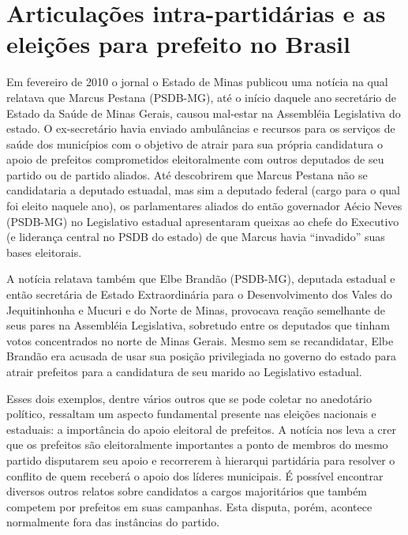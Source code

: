 \chapter{Articulações intra-partidárias e as eleições para prefeito no Brasil}
\label{cap:eleicoes}

Em fevereiro de 2010 o jornal o Estado de Minas publicou uma notícia na qual relatava que Marcus Pestana (PSDB-MG), até o início daquele ano secretário de Estado da Saúde de Minas Gerais, causou mal-estar na Assembléia Legislativa do estado. O ex-secretário havia enviado ambulâncias e recursos para os serviços de saúde dos municípios com o objetivo de atrair para sua própria candidatura o apoio de prefeitos comprometidos eleitoralmente com outros deputados de seu partido ou de partido aliados. Até descobrirem que Marcus Pestana não se candidataria a deputado estuadal, mas sim a deputado federal (cargo para o qual foi eleito naquele ano), os parlamentares aliados do então governador Aécio Neves (PSDB-MG) no Legislativo estadual apresentaram queixas ao chefe do Executivo (e liderança central no PSDB do estado) de que Marcus havia ``invadido'' suas bases eleitorais. 

A notícia relatava também que Elbe Brandão (PSDB-MG), deputada estadual e então secretária de Estado Extraordinária para o Desenvolvimento dos Vales do Jequitinhonha e Mucuri e do Norte de Minas, provocava reação semelhante de seus pares na Assembléia Legislativa, sobretudo entre os deputados que tinham votos concentrados no norte de Minas Gerais. Mesmo sem se recandidatar, Elbe Brandão era acusada de usar sua posição privilegiada no governo do estado para atrair prefeitos para a candidatura de seu marido ao Legislativo estadual.

Esses dois exemplos, dentre vários outros que se pode coletar no anedotário político, ressaltam um aspecto fundamental presente nas eleições nacionais e estaduais: a importância do apoio eleitoral de prefeitos. A notícia nos leva a crer que os prefeitos são eleitoralmente importantes a ponto de membros do mesmo partido disputarem seu apoio e recorrerem à hierarqui partidária para resolver o conflito de quem receberá o apoio dos líderes municipais. É possível encontrar diversos outros relatos sobre candidatos a cargos majoritários que também competem por prefeitos em suas campanhas. Esta disputa, porém, acontece normalmente fora das instâncias do partido. %

